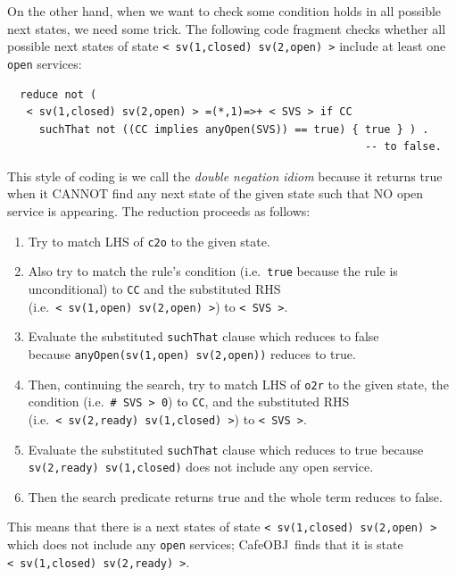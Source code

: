 \documentclass[12pt]{report}
\newcommand{\stt}[1]{{\small{\tt {#1}}}}
\newcommand{\cafeobj}{{\sf CafeOBJ}~}
\begin{document}
On the other hand, when we want to check some condition holds in all
possible next states, we need some trick. The following code fragment
checks whether all possible next states of state
\stt{<~sv(1,closed)~sv(2,open)~>} include at least one {\tt open} services:
\begin{verbatim}
  reduce not (
   < sv(1,closed) sv(2,open) > =(*,1)=>+ < SVS > if CC
     suchThat not ((CC implies anyOpen(SVS)) == true) { true } ) .
                                                        -- to false.
\end{verbatim}
This style of coding is we call the {\it double negation idiom}
because it returns true when it CANNOT find any next state of the
given state such that NO open service is appearing. The reduction
proceeds as follows:
\begin{enumerate}
\item Try to match LHS of {\tt c2o} to the given state.
\item Also try to match the rule's condition (i.e.\ {\tt true} because
  the rule is unconditional) to {\tt CC} and the substituted RHS
  (i.e.\ \stt{<~sv(1,open)~sv(2,open)~>}) to \stt{<~SVS~>}.
\item Evaluate the substituted {\tt suchThat} clause which reduces to
  false \\ because \stt{anyOpen(sv(1,open) sv(2,open))} reduces to
  true.
\item Then, continuing the search, try to match LHS of {\tt o2r} to
  the given state, the condition (i.e.\ \stt{\# SVS > 0}) to {\tt CC},
  and the substituted RHS (i.e.\ \stt{<~sv(2,ready)~sv(1,closed)~>}) to
  \stt{<~SVS~>}.
\item Evaluate the substituted {\tt suchThat} clause which reduces to
  true because \stt{sv(2,ready) sv(1,closed)} does not include any
  open service.
\item Then the search predicate returns true and the whole term
  reduces to false.
\end{enumerate}
This means that there is a next states of state
\stt{<~sv(1,closed)~sv(2,open)~>} which does not include any {\tt open}
services; \cafeobj finds that it is state
\stt{<~sv(1,closed)~sv(2,ready)~>}.
\end{document}
